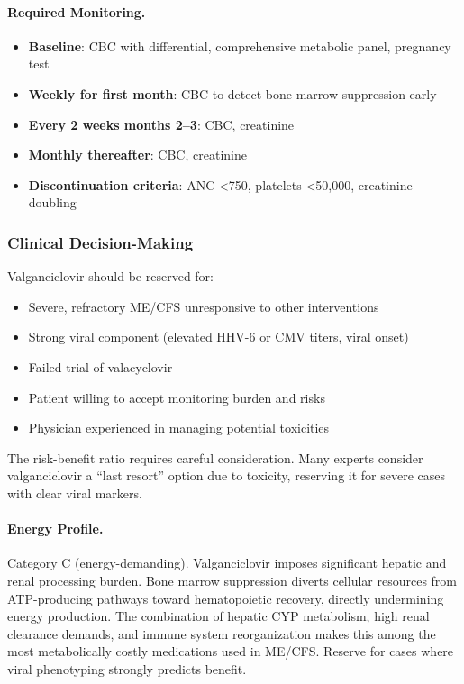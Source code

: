 \paragraph{Required Monitoring.}
\begin{itemize}
    \item \textbf{Baseline}: CBC with differential, comprehensive metabolic panel, pregnancy test
    \item \textbf{Weekly for first month}: CBC to detect bone marrow suppression early
    \item \textbf{Every 2 weeks months 2--3}: CBC, creatinine
    \item \textbf{Monthly thereafter}: CBC, creatinine
    \item \textbf{Discontinuation criteria}: ANC <750, platelets <50,000, creatinine doubling
\end{itemize}

\subsubsection{Clinical Decision-Making}

Valganciclovir should be reserved for:
\begin{itemize}
    \item Severe, refractory ME/CFS unresponsive to other interventions
    \item Strong viral component (elevated HHV-6 or CMV titers, viral onset)
    \item Failed trial of valacyclovir
    \item Patient willing to accept monitoring burden and risks
    \item Physician experienced in managing potential toxicities
\end{itemize}

The risk-benefit ratio requires careful consideration. Many experts consider valganciclovir a ``last resort'' option due to toxicity, reserving it for severe cases with clear viral markers.

\paragraph{Energy Profile.}
Category C (energy-demanding). Valganciclovir imposes significant hepatic and renal processing burden. Bone marrow suppression diverts cellular resources from ATP-producing pathways toward hematopoietic recovery, directly undermining energy production. The combination of hepatic CYP metabolism, high renal clearance demands, and immune system reorganization makes this among the most metabolically costly medications used in ME/CFS. Reserve for cases where viral phenotyping strongly predicts benefit.

